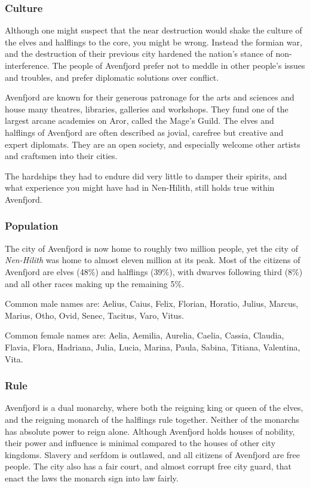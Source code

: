 
\subsubsection{Culture}

Although one might suspect that the near destruction would shake the culture
of the elves and halflings to the core, you might be wrong. Instead the
formian war, and the destruction of their previous city hardened the nation's
stance of non-interference. The people of Avenfjord prefer not to meddle in
other people's issues and troubles, and prefer diplomatic solutions over
conflict.

Avenfjord are known for their generous patronage for the arts and sciences and
house many theatres, libraries, galleries and workshops. They fund one of the
largest arcane academies on Aror, called the Mage's Guild. The elves and
halflings of Avenfjord are often described as jovial, carefree but creative
and expert diplomats. They are an open society, and especially welcome other
artists and craftsmen into their cities.

The hardships they had to endure did very little to damper their spirits, and
what experience you might have had in Nen-Hilith, still holds true within
Avenfjord.

\subsubsection{Population}

The city of Avenfjord is now home to roughly two million people, yet the city
of \emph{Nen-Hilith} was home to almost eleven million at its peak. Most of
the citizens of Avenfjord are elves (48\%) and halflings (39\%), with dwarves
following third (8\%) and all other races making up the remaining 5\%.

Common male names are: Aelius, Caius, Felix, Florian, Horatio, Julius, Marcus,
Marius, Otho, Ovid, Senec, Tacitus, Varo, Vitus.

Common female names are: Aelia, Aemilia, Aurelia, Caelia, Cassia, Claudia,
Flavia, Flora, Hadriana, Julia, Lucia, Marina, Paula, Sabina, Titiana,
Valentina, Vita.

\subsubsection{Rule}

Avenfjord is a dual monarchy, where both the reigning king or queen of the
elves, and the reigning monarch of the halflings rule together. Neither of the
monarchs has absolute power to reign alone. Although Avenfjord holds houses of
nobility, their power and influence is minimal compared to the houses of other
city kingdoms. Slavery and serfdom is outlawed, and all citizens of Avenfjord
are free people. The city also has a fair court, and almost corrupt free city
guard, that enact the laws the monarch sign into law fairly.


